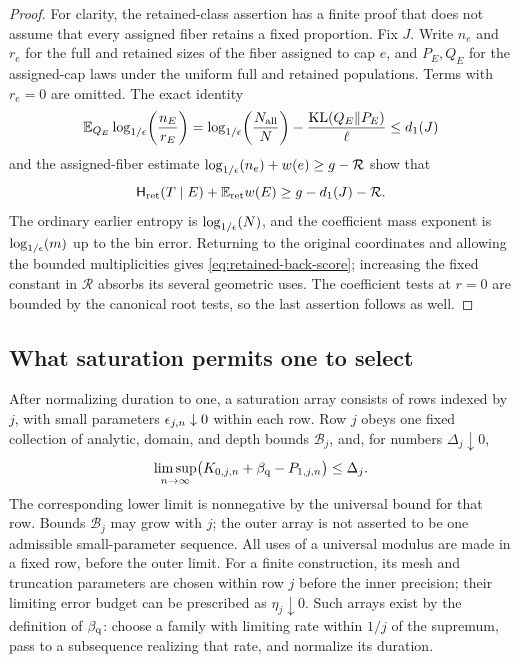 \begin{proof}
For clarity, the retained-class assertion has a finite proof that does
not assume that every assigned fiber retains a fixed proportion.
Fix $J$.  Write $n_e$ and $r_e$ for the full and retained sizes of the
fiber assigned to cap $e$, and $P_E,Q_E$ for the assigned-cap laws
under the uniform full and retained populations.  Terms with $r_e=0$
are omitted.  The exact identity
\begin{equation}\label{eq:retained-fiber-relative-entropy}
 \mathbb E_{Q_E}\log_{1/\epsilon}\!\left(\frac{n_E}{r_E}\right)
  =\log_{1/\epsilon}\!\left(\frac{N_{\rm all}}{N}\right)
        -\frac{\operatorname{KL}(Q_E\Vert P_E)}{\ell}
  \le d_1(J)
\end{equation}
and the assigned-fiber estimate
$\log_{1/\epsilon}\!\left(n_e\right)+w(e)\ge g-\mathcal R$
show that
\[
 \mathsf H_{\rm ret}(T\mid E)+\mathbb E_{\rm ret}w(E)
       \ge g-d_1(J)-\mathcal R.
\]
The ordinary earlier entropy is $\log_{1/\epsilon}\!\left(N\right)$, and the coefficient
mass exponent is $\log_{1/\epsilon}\!\left(m\right)$ up to the bin error.  Returning to the
original coordinates and allowing the bounded multiplicities gives
\eqref{eq:retained-back-score}; increasing the fixed constant in
$\mathcal R$ absorbs its several geometric uses.  The coefficient
tests at $r=0$ are bounded by the canonical root tests, so the last
assertion follows as well.
\end{proof}

\subsection{What saturation permits one to select}

\begin{definition}
\label{def:packet-saturation-array}
After normalizing duration to one, a saturation array consists of
rows indexed by $j$, with small parameters $\epsilon_{j,n}\downarrow0$
within each row.  Row $j$ obeys one fixed collection of analytic,
domain, and depth bounds $\mathcal B_j$, and, for numbers
$\Delta_j\downarrow0$,
\[
 \limsup_{n\to\infty}
 \bigl(K_{0,j,n}+\beta_{\mathrm q}-P_{1,j,n}\bigr)\le\Delta_j.
\]
The corresponding lower limit is nonnegative by the universal bound
for that row.  Bounds $\mathcal B_j$ may grow with $j$; the outer
array is not asserted to be one admissible small-parameter sequence.
All uses of a universal modulus are made in a fixed row, before the
outer limit.  For a finite construction, its mesh and truncation
parameters are chosen within row $j$ before the inner precision;
their limiting error budget can be prescribed as $\eta_j\downarrow0$.
Such arrays exist by the definition of $\beta_{\mathrm q}$:
choose a family with limiting rate within $1/j$ of the supremum,
pass to a subsequence realizing that rate, and normalize its duration.
\end{definition}


